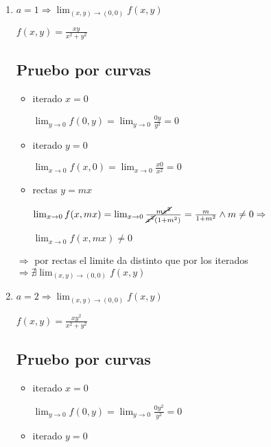 \documentclass[../parcial.tex]{subfiles}
\begin{document}
    \begin{enumerate}
        \item $ a = 1 \Rightarrow \lim_{(x,y) \to (0,0)} f(x,y) $

        $ f(x,y) = \frac{xy}{x^2+y^2} $

        \subsection*{Pruebo por curvas}

        \begin{itemize}
            \item iterado $x = 0$

                $\lim_{y\to0} f(0,y) = \lim_{y\to0} \frac{0y}{y^2} = 0$

            \item iterado $y = 0$

                $\lim_{x\to0} f(x,0) = \lim_{x\to0} \frac{x0}{x^2} = 0$

            \item rectas $y = mx$
            
                $\lim_{x\to0} f(x,mx) = \lim_{x\to0} \frac{m\cancel{x^2}}{\cancel{x^2}(1+m^2)} = \frac{m}{1+m^2} \wedge m \neq 0 \Rightarrow$

                $\lim_{x\to0} f(x,mx) \neq 0$

        \end{itemize}

        $ \Rightarrow $ por rectas el limite da distinto que por los iterados $ \Rightarrow \nexists \lim_{(x,y) \to (0,0)} f(x,y)$

        \item $ a = 2 \Rightarrow \lim_{(x,y) \to (0,0)} f(x,y) $
        
            $ f(x,y) = \frac{xy^2}{x^2+y^2} $
        
            \subsection*{Pruebo por curvas}

            \begin{itemize}
                \item iterado $ x = 0$

                    $\lim_{y\to0} f(0,y) = \lim_{y\to0} \frac{0y^2}{y^2} = 0$

                \item iterado $ y = 0$


\end{itemize}
\end{enumerate}
\end{document}
